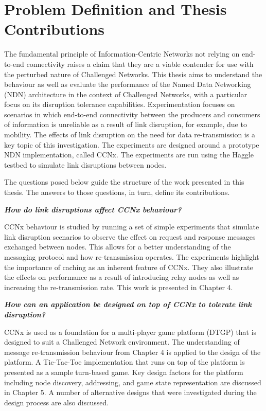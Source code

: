 \documentclass[a4paper,12pt]{report}      %
\begin{document}
\pagebreak
\chapter{Problem Definition and Thesis Contributions}

The fundamental principle of Information-Centric Networks not relying on end-to-end connectivity
raises a claim that they are a viable contender for use with the perturbed nature of
Challenged Networks. This thesis aims to understand the behaviour as well as evaluate the performance of
 the Named Data Networking (NDN) architecture in the context of Challenged Networks, with a particular focus 
on its disruption tolerance capabilities. Experimentation focuses on scenarios in which end-to-end connectivity between 
the producers and consumers of information is unreliable as a result of link disruption, for example, due to mobility. 
The effects of link disruption on the need for data re-transmission is a key topic of this investigation.
The experiments are designed around a prototype NDN implementation, called CCNx. The experiments are run using the
Haggle\cite{haggle} testbed to simulate link disruptions between nodes. 

The questions posed below guide the structure of the work presented in this thesis. The answers to those questions, in turn, define its contributions.

\vspace{1em}
\noindent\textbf{\textsl{How do link disruptions affect CCNx behaviour?}} \par
CCNx behaviour is studied by running a set of simple experiments that simulate link disruption scenarios
to observe the effect on request and response messages exchanged between nodes. This allows for a better understanding 
of the messaging protocol and how re-transmission operates. The experiments highlight the importance of caching as
an inherent feature of CCNx. They also illustrate the effects on performance as a result of introducing relay nodes
as well as increasing the re-transmission rate. This work is presented in Chapter 4. 

\vspace{1em}
\noindent\textsl{\textbf{How can an application be designed on top of CCNx to tolerate link disruption?}} \par
CCNx is used as a foundation for a multi-player game platform (DTGP) that is designed to suit a Challenged Network environment. 
The understanding of message re-transmission behaviour from Chapter 4 is applied to the design of the platform. A Tic-Tac-Toe implementation 
that runs on top of the platform is presented as a sample turn-based game. Key design factors for the platform including
node discovery, addressing, and game state representation are discussed in Chapter 5. A number of alternative designs that were investigated 
during the design process are also discussed.
\end{document}
